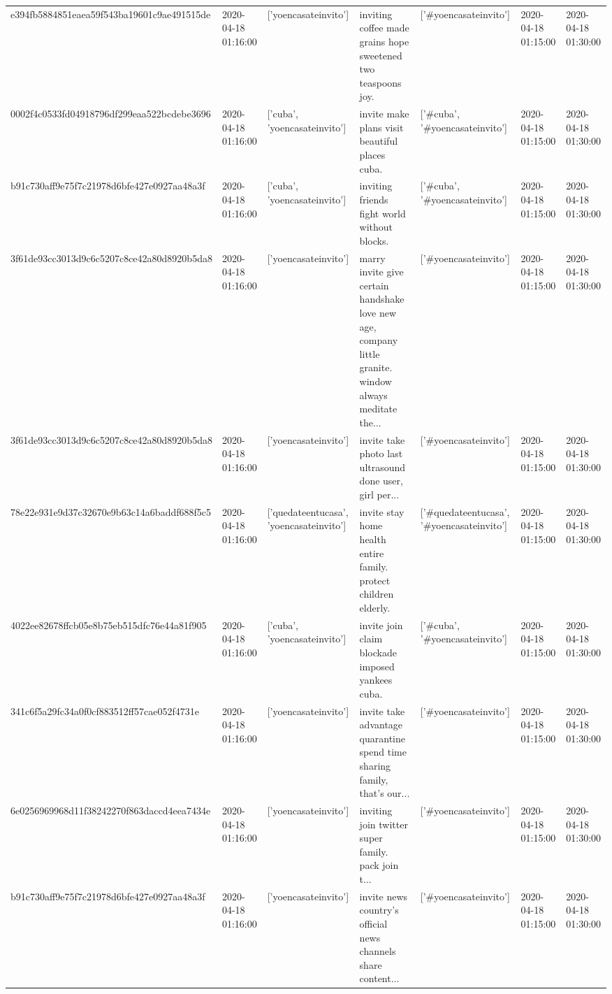 \begin{tabular}{lllllll}
e394fb5884851eaea59f543ba19601c9ae491515de & 2020-04-18 01:16:00 & ['yoencasateinvito'] & inviting coffee made grains hope sweetened two teaspoons joy. & ['#yoencasateinvito'] & 2020-04-18 01:15:00 & 2020-04-18 01:30:00 \\
0002f4c0533fd04918796df299eaa522bcdebe3696 & 2020-04-18 01:16:00 & ['cuba', 'yoencasateinvito'] & invite make plans visit beautiful places cuba. & ['#cuba', '#yoencasateinvito'] & 2020-04-18 01:15:00 & 2020-04-18 01:30:00 \\
b91c730aff9e75f7c21978d6bfe427e0927aa48a3f & 2020-04-18 01:16:00 & ['cuba', 'yoencasateinvito'] & inviting friends fight world without blocks. & ['#cuba', '#yoencasateinvito'] & 2020-04-18 01:15:00 & 2020-04-18 01:30:00 \\
3f61de93cc3013d9c6c5207c8ce42a80d8920b5da8 & 2020-04-18 01:16:00 & ['yoencasateinvito'] & marry invite give certain handshake love new age, company little granite. window always meditate the... & ['#yoencasateinvito'] & 2020-04-18 01:15:00 & 2020-04-18 01:30:00 \\
3f61de93cc3013d9c6c5207c8ce42a80d8920b5da8 & 2020-04-18 01:16:00 & ['yoencasateinvito'] & invite take photo last ultrasound done user, girl per... & ['#yoencasateinvito'] & 2020-04-18 01:15:00 & 2020-04-18 01:30:00 \\
78e22e931e9d37c32670e9b63c14a6baddf688f5c5 & 2020-04-18 01:16:00 & ['quedateentucasa', 'yoencasateinvito'] & invite stay home health entire family. protect children elderly. & ['#quedateentucasa', '#yoencasateinvito'] & 2020-04-18 01:15:00 & 2020-04-18 01:30:00 \\
4022ee82678ffcb05e8b75eb515dfc76e44a81f905 & 2020-04-18 01:16:00 & ['cuba', 'yoencasateinvito'] & invite join claim blockade imposed yankees cuba. & ['#cuba', '#yoencasateinvito'] & 2020-04-18 01:15:00 & 2020-04-18 01:30:00 \\
341c6f5a29fc34a0f0cf883512ff57cae052f4731e & 2020-04-18 01:16:00 & ['yoencasateinvito'] & invite take advantage quarantine spend time sharing family, that's our... & ['#yoencasateinvito'] & 2020-04-18 01:15:00 & 2020-04-18 01:30:00 \\
6e0256969968d11f38242270f863daccd4eea7434e & 2020-04-18 01:16:00 & ['yoencasateinvito'] & inviting join twitter super family. pack join t... & ['#yoencasateinvito'] & 2020-04-18 01:15:00 & 2020-04-18 01:30:00 \\
b91c730aff9e75f7c21978d6bfe427e0927aa48a3f & 2020-04-18 01:16:00 & ['yoencasateinvito'] & invite news country's official news channels share content... & ['#yoencasateinvito'] & 2020-04-18 01:15:00 & 2020-04-18 01:30:00 \\

\end{tabular}
